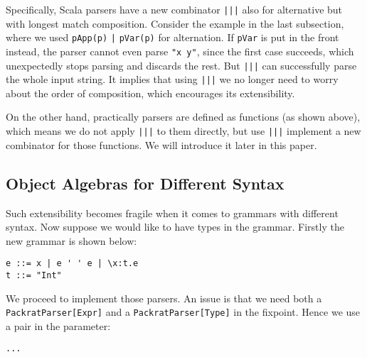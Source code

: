 Specifically, Scala parsers have a new combinator \lstinline{|||} also for alternative but with longest match composition. Consider the example in the last subsection, where we used \lstinline{pApp(p)} \lstinline{|} \lstinline{pVar(p)} for alternation. If \lstinline{pVar} is put in the front instead, the parser cannot even parse \lstinline{"x y"}, since the first case succeeds, which unexpectedly stops parsing and discards the rest. But \lstinline{|||} can successfully parse the whole input string. It implies that using \lstinline{|||} we no longer need to worry about the order of composition, which encourages its extensibility.

On the other hand, practically parsers are defined as functions (as shown above), which means we do not apply \lstinline{|||} to them directly, but use \lstinline{|||} implement a new combinator for those functions. We will introduce it later in this paper.

\subsection{Object Algebras for Different Syntax}\label{subsec:differentsyntax}

Such extensibility becomes fragile when it comes to grammars with different syntax. Now suppose we would like to have types in the grammar. Firstly the new grammar is shown below:
\begin{lstlisting}
e ::= x | e ' ' e | \x:t.e
t ::= "Int"
\end{lstlisting}

We proceed to implement those parsers. An issue is that we need both a \lstinline{PackratParser[Expr]} and a \lstinline{PackratParser[Type]} in the fixpoint.
Hence we use a pair in the parameter:
\begin{lstlisting}
...
\end{lstlisting}

